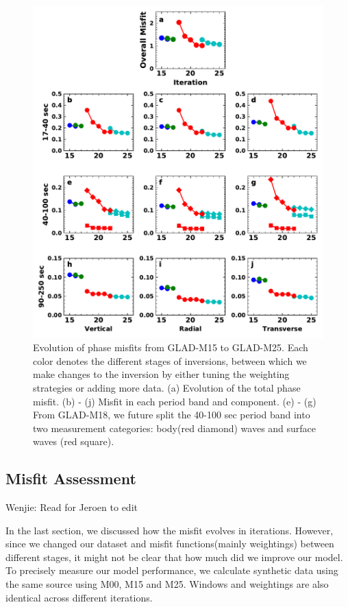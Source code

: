 \documentclass[extra,mreferee]{gji}
\begin{document}
\begin{figure}
  \centering
  \includegraphics[width=\textwidth]{figures/misfit.pdf}
  \caption{Evolution of phase misfits from GLAD-M15 to GLAD-M25.
  Each color denotes the different stages of inversions, between
  which we make changes to the inversion by either tuning the
  weighting strategies or adding more data.
  (a) Evolution of the total phase misfit. (b) - (j) Misfit in
  each period band and component. (e) - (g) From GLAD-M18,
  we future split the 40-100 sec period band into two
  measurement categories: body(red diamond) waves and surface waves
  (red square).}
  \label{fig:misfit}
\end{figure}

\subsection{Misfit Assessment}

{\color{Red} Wenjie: Read for Jeroen to edit}

In the last section, we discussed how the misfit evolves in iterations. However, since
we changed our dataset and misfit functions(mainly weightings) between different stages,
it might not be clear that how much did we improve our model. To precisely measure
our model performance, we calculate synthetic data using the same source using M00, M15
and M25. Windows and weightings are also identical across different iterations.
\end{document}
